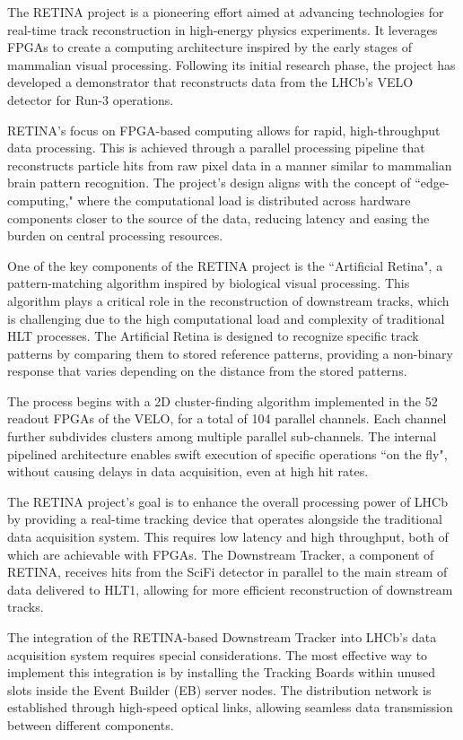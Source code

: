 The RETINA project\cite{Lazzari:2801062} is a pioneering effort aimed at advancing technologies for real-time track reconstruction in high-energy physics experiments. It leverages FPGAs to create a computing architecture inspired by the early stages of mammalian visual processing. Following its initial research phase, the project has developed a demonstrator that reconstructs data from the LHCb's VELO detector for Run-3 operations.

RETINA's focus on FPGA-based computing allows for rapid, high-throughput data processing. This is achieved through a parallel processing pipeline that reconstructs particle hits from raw pixel data in a manner similar to mammalian brain pattern recognition. The project's design aligns with the concept of ``edge-computing," where the computational load is distributed across hardware components closer to the source of the data, reducing latency and easing the burden on central processing resources.

One of the key components of the RETINA project is the ``Artificial Retina"\cite{Ristori:2000vg}, a pattern-matching algorithm inspired by biological visual processing. This algorithm plays a critical role in the reconstruction of downstream tracks, which is challenging due to the high computational load and complexity of traditional HLT processes. The Artificial Retina is designed to recognize specific track patterns by comparing them to stored reference patterns, providing a non-binary response that varies depending on the distance from the stored patterns.

The process begins with a 2D cluster-finding algorithm implemented in the 52 readout FPGAs of the VELO, for a total of 104 parallel channels. Each channel further subdivides clusters among multiple parallel sub-channels. The internal pipelined architecture enables swift execution of specific operations ``on the fly", without causing delays in data acquisition, even at high hit rates.

The RETINA project’s goal is to enhance the overall processing power of LHCb by providing a real-time tracking device that operates alongside the traditional data acquisition system. This requires low latency and high throughput, both of which are achievable with FPGAs. The Downstream Tracker, a component of RETINA, receives hits from the SciFi detector in parallel to the main stream of data delivered to HLT1, allowing for more efficient reconstruction of downstream tracks.

The integration of the RETINA-based Downstream Tracker into LHCb's data acquisition system requires special considerations\cite{Lazzari:2888549}. The most effective way to implement this integration is by installing the Tracking Boards within unused slots inside the Event Builder (EB) server nodes. The distribution network is established through high-speed optical links, allowing seamless data transmission between different components.

